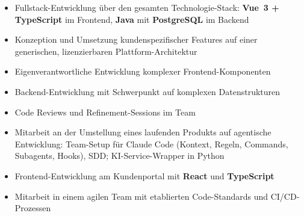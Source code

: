 \begin{itemize}
  \item Fullstack-Entwicklung über den gesamten Technologie-Stack: \textbf{Vue~3 + TypeScript} im Frontend, \textbf{Java} mit \textbf{PostgreSQL} im Backend
  \item Konzeption und Umsetzung kundenspezifischer Features auf einer generischen, lizenzierbaren Plattform-Architektur
  \item Eigenverantwortliche Entwicklung komplexer Frontend-Komponenten
  \item Backend-Entwicklung mit Schwerpunkt auf komplexen Datenstrukturen
  \item Code Reviews und Refinement-Sessions im Team
  \item Mitarbeit an der Umstellung eines laufenden Produkts auf agentische Entwicklung: Team-Setup für Claude Code (Kontext, Regeln, Commands, Subagents, Hooks), SDD; KI-Service-Wrapper in Python
\end{itemize}

\begin{itemize}
  \item Frontend-Entwicklung am Kundenportal mit \textbf{React} und \textbf{TypeScript}
  \item Mitarbeit in einem agilen Team mit etablierten Code-Standards und CI/CD-Prozessen
\end{itemize}


